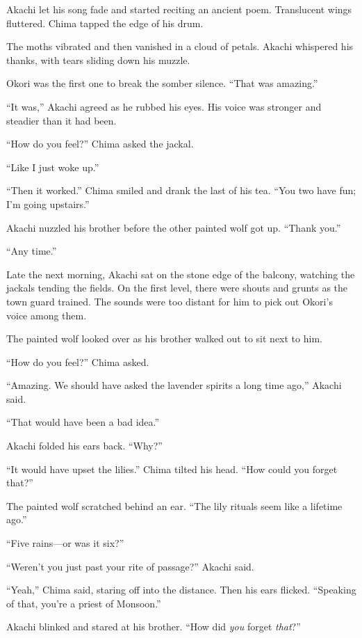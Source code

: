 Akachi let his song fade and started reciting an ancient poem. Translucent wings fluttered. Chima tapped the edge of his drum.

The moths vibrated and then vanished in a cloud of petals. Akachi whispered his thanks, with tears sliding down his muzzle. 

Okori was the first one to break the somber silence. ``That was amazing.''

``It was,'' Akachi agreed as he rubbed his eyes. His voice was stronger and steadier than it had been.

``How do you feel?'' Chima asked the jackal. 

``Like I just woke up.''

``Then it worked.'' Chima smiled and drank the last of his tea. ``You two have fun; I'm going upstairs.''

Akachi nuzzled his brother before the other painted wolf got up. ``Thank you.''

``Any time.''

\secdiv

\noindent Late the next morning, Akachi sat on the stone edge of the balcony, watching the jackals tending the fields. On the first level, there were shouts and grunts as the town guard trained. The sounds were too distant for him to pick out Okori's voice among them.

The painted wolf looked over as his brother walked out to sit next to him. 

``How do you feel?'' Chima asked.

``Amazing. We should have asked the lavender spirits a long time ago,'' Akachi said.

``That would have been a bad idea.''

Akachi folded his ears back. ``Why?''

``It would have upset the lilies.'' Chima tilted his head. ``How could you forget that?''

The painted wolf scratched behind an ear. ``The lily rituals seem like a lifetime ago.''

``Five rains---or was it six?''

``Weren't you just past your rite of passage?'' Akachi said.

``Yeah,'' Chima said, staring off into the distance. Then his ears flicked. ``Speaking of that, you're a priest of Monsoon.''

Akachi blinked and stared at his brother. ``How did \emph{you} forget \emph{that}?''

